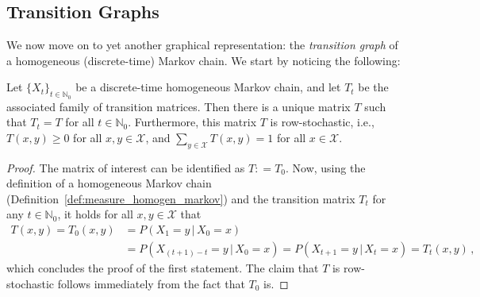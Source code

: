 \documentclass[graybox]{svmult}
\newcommand{\nats}{\mathbb{N}}
\newcommand{\natswith}{\nats_{0}}
\newcommand{\states}{\mathcal{X}}
\newcommand{\coloneqq}{:\!=}
\begin{document}
\subsection{Transition Graphs}

We now move on to yet another graphical representation: the \emph{transition graph} of a homogeneous (discrete-time) Markov chain. We start by noticing the following:
\begin{proposition}
Let $\{X_t\}_{t\in\natswith}$ be a discrete-time homogeneous Markov chain, and let $T_t$ be the associated family of transition matrices. Then there is a unique matrix $T$ such that $T_t=T$ for all $t\in\natswith$. Furthermore, this matrix $T$ is row-stochastic, i.e., $T(x,y)\geq 0$ for all $x,y\in\states$, and $\sum_{y\in\states}T(x,y)=1$ for all $x\in\states$.
\end{proposition}
\begin{proof}
The matrix of interest can be identified as $T\coloneqq T_0$. Now, using the definition of a homogeneous Markov chain (Definition~\ref{def:measure_homogen_markov}) and the transition matrix $T_t$ for any $t\in\natswith$, it holds for all $x,y\in\states$ that
\begin{align*}
T(x,y) = T_0(x,y) &= P(X_1=y\,\vert\,X_0=x) \\
 &= P(X_{(t+1)-t}=y\,\vert\,X_0=x)=P(X_{t+1}=y\,\vert\,X_t=x)=T_t(x,y)\,,
\end{align*}
which concludes the proof of the first statement. The claim that $T$ is row-stochastic follows immediately from the fact that $T_0$ is.
\end{proof}
\end{document}
